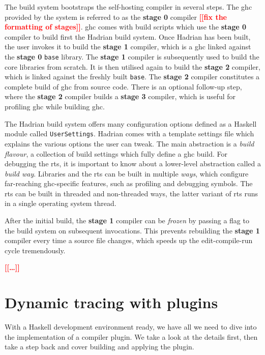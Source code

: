 \documentclass[thesis=B,english]{FITthesis}[2019/12/23]
\newcommand{\todo}[1]{\textcolor{red}{\textbf{[[#1]]}}}
\newcommand{\hackage}[1]{\texttt{#1}}
\newcommand{\hsModule}[1]{\texttt{#1}}
\begin{document}
The build system bootstraps the self-hosting compiler in several steps. The
\acrshort{ghc} provided by the system is referred to as the \textbf{stage 0}
compiler \todo{fix the formatting of stages}. \acrshort{ghc} comes with build
scripts which use the \textbf{stage 0} compiler to build first the Hadrian
build system. Once Hadrian has been built, the user invokes it to build the
\textbf{stage 1} compiler, which is a \acrshort{ghc} linked against the
\textbf{stage 0} \hackage{base} library. The \textbf{stage 1} compiler is
subsequently used to build the core libraries from scratch. It is then utilised
again to build the \textbf{stage 2} compiler, which is linked against the
freshly built \hackage{base}. The \textbf{stage 2} compiler constitutes a
complete build of \acrshort{ghc} from source code. There is an optional
follow-up step, where the \textbf{stage 2} compiler builds a \textbf{stage 3}
compiler, which is useful for profiling \acrshort{ghc} while building
\acrshort{ghc}.

The Hadrian build system offers many configuration options defined as a Haskell
module called \hsModule{UserSettings}. Hadrian comes with a template settings
file which explains the various options the user can tweak. The main
abstraction is a \textit{build flavour}, a collection of build settings which
fully define a \acrshort{ghc} build. For debugging the \acrshort{rts}, it is
important to know about a lower-level abstraction called a \textit{build way}.
Libraries and the \acrshort{rts} can be built in multiple \textit{ways}, which
configure far-reaching \acrshort{ghc}-specific features, such as profiling and
debugging symbols. The \acrshort{rts} can be built in threaded and non-threaded
ways, the latter variant of \acrshort{rts} runs in a single operating system
thread.

After the initial build, the \textbf{stage 1} compiler can be \textit{frozen}
by passing a flag to the build system on subsequent invocations. This prevents
rebuilding the \textbf{stage 1} compiler every time a source file changes, which
speeds up the edit-compile-run cycle tremendously.

\todo{\ldots}

\section{Dynamic tracing with plugins}
With a Haskell development environment ready, we have all we need to dive into
the implementation of a compiler plugin. We take a look at the details first,
then take a step back and cover building and applying the plugin.
\end{document}
